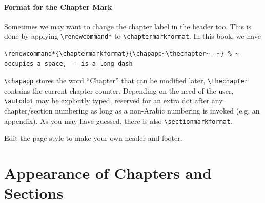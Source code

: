 \paragraph{Format for the Chapter Mark}
Sometimes we may want to change the chapter label in the header too. This is done by applying \texttt{\textbackslash renewcommand*} to \texttt{\textbackslash chaptermarkformat}. In this book, we have
\begin{lstlisting}
\renewcommand*{\chaptermarkformat}{\chapapp~\thechapter~--~} % ~ occupies a space, -- is a long dash
\end{lstlisting}
\texttt{\textbackslash chapapp} stores the word “Chapter” that can be modified later, \texttt{\textbackslash thechapter} contains the current chapter counter. Depending on the need of the user, \texttt{\textbackslash autodot} may be explicitly typed, reserved for an extra dot after any chapter/section numbering as long as a non-Arabic numbering is invoked (e.g. an appendix). As you may have guessed, there is also \texttt{\textbackslash sectionmarkformat}.

\begin{exercisebox}
\begin{Exercise}
Edit the page style to make your own header and footer.
\end{Exercise}
\end{exercisebox}

\section{Appearance of Chapters and Sections}
\label{sec:appearch}

